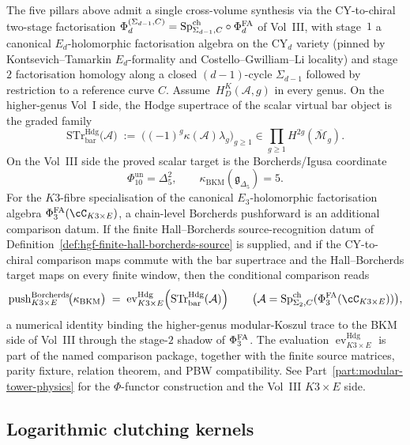 \begin{remark}
\label{rem:hgf-phi-trace-identity}
The five pillars above admit a single cross-volume synthesis via the
CY-to-chiral two-stage factorisation
$\Phi_d^{(\Sigma_{d-1},C)} = \mathrm{Sp}^{\mathrm{ch}}_{\Sigma_{d-1}, C} \circ \Phi^{\mathrm{FA}}_d$ of Vol~III, with
stage~$1$ a canonical $E_d$-holomorphic factorisation algebra on the
CY$_d$ variety (pinned by Kontsevich--Tamarkin $E_d$-formality and
Costello--Gwilliam--Li locality) and stage~$2$ factorisation homology
along a closed $(d-1)$-cycle $\Sigma_{d-1}$ followed by restriction to
a reference curve $C$.  Assume~$H_D^K(\mathcal A,g)$ in every genus.
On the higher-genus Vol~I side, the Hodge supertrace of the scalar
virtual bar object is the graded family
\[
\mathrm{STr}_{\mathrm{bar}}^{\mathrm{Hdg}}\!\bigl(\mathcal{A}\bigr)
\;:=\;
\bigl((-1)^g\kappa(\mathcal{A})\lambda_g\bigr)_{g\geq1}
\in
\prod_{g\geq1}H^{2g}(\overline{\mathcal{M}}_g).
\]
On the Vol~III side the proved scalar target is the Borcherds/Igusa
coordinate
\[
\Phi_{10}^{\mathrm{un}}=\Delta_5^2,\qquad
\kappa_{\mathrm{BKM}}(\mathfrak g_{\Delta_5})=5.
\]
For the $K3$-fibre specialisation of the canonical
$E_3$-holomorphic factorisation algebra
$\PhiFA_3(\cC_{K3 \times E})$, a chain-level Borcherds pushforward is
an additional comparison datum. If the finite Hall--Borcherds
source-recognition datum of
Definition~\ref{def:hgf-finite-hall-borcherds-source} is supplied,
and if the CY-to-chiral comparison maps commute with the bar
supertrace and the Hall--Borcherds target maps on every finite window,
then the conditional comparison reads
\[
\mathrm{push}_{K3 \times E}^{\mathrm{Borcherds}}\!\bigl(\kappa_{\mathrm{BKM}}\bigr)
\;=\;
\operatorname{ev}_{K3\times E}^{\mathrm{Hdg}}\!\left(
\mathrm{STr}_{\mathrm{bar}}^{\mathrm{Hdg}}(\mathcal A)\right)
\qquad
\bigl(\mathcal{A} = \SpCh_{\Sigma_2, C}(\PhiFA_3(\cC_{K3 \times E}))\bigr),
\]
a numerical identity binding the higher-genus modular-Koszul
trace to the BKM side of Vol~III through the stage-$2$ shadow of
$\Phi^{\mathrm{FA}}_3$.  The evaluation
$\operatorname{ev}_{K3\times E}^{\mathrm{Hdg}}$ is part of the named
comparison package, together with the finite source matrices, parity
fixture, relation theorem, and PBW compatibility.  See
Part~\ref{part:modular-tower-physics} for
the $\Phi$-functor construction and the Vol~III $K3 \times E$ side.
\end{remark}

\subsection{Logarithmic clutching kernels}
\label{subsec:log-clutching-kernels}

